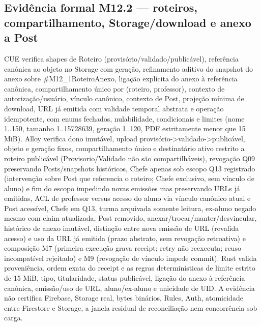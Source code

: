 \subsection*{Evidência formal M12.2 --- roteiros, compartilhamento, Storage/download e anexo a Post}
CUE verifica shapes de Roteiro (provisório/validado/publicável), referência canônica ao objeto no Storage com geração, refinamento aditivo do snapshot do anexo sobre \#M12\_1RoteiroAnexo, ligação explícita do anexo à referência canônica, compartilhamento único por (roteiro, professor), contexto de autorização/usuário, vínculo canônico, contexto de Post, projeção mínima de download, URL já emitida com validade temporal abstrata e operação idempotente, com enums fechados, nulabilidade, condicionais e limites (nome 1..150, tamanho 1..15728639, geração 1..120, PDF estritamente menor que 15 MiB). Alloy verifica dono imutável, upload provisório->validado->publicável, objeto e geração fixos, compartilhamento único e destinatário ativo restrito a roteiro publicável (Provisorio/Validado não são compartilháveis), revogação Q09 preservando Posts/snapshots históricos, Chefe apenas sob escopo Q13 registrado (intervenção sobre Post que referencia o roteiro; Chefe exclusivo, sem vínculo de aluno) e fim do escopo impedindo novas emissões mas preservando URLs já emitidas, ACL de professor versus acesso do aluno via vínculo canônico atual e Post acessível, Chefe em Q13, turma arquivada somente leitura, ex-aluno negado mesmo com claim atualizada, Post removido, anexar/trocar/manter/desvincular, histórico de anexo imutável, distinção entre nova emissão de URL (revalida acesso) e uso da URL já emitida (prazo abstrato, sem revogação retroativa) e composição M7 (primeira execução grava receipt; retry não reexecuta; reuso incompatível rejeitado) e M9 (revogação de vínculo impede commit). Rust valida proveniência, ordem exata do receipt e as regras determinísticas de limite estrito de 15 MiB, tipo, titularidade, status publicável, ligação do anexo à referência canônica, emissão/uso de URL, aluno/ex-aluno e unicidade de UID. A evidência não certifica Firebase, Storage real, bytes binários, Rules, Auth, atomicidade entre Firestore e Storage, a janela residual de reconciliação nem concorrência sob carga.
